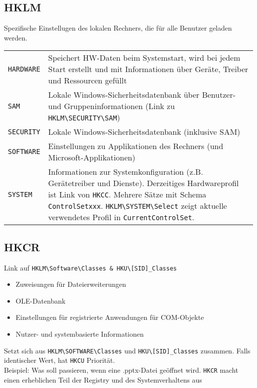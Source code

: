 \begin{multicols}{3}
\subsection{HKLM}
Spezifische Einstellugen des lokalen Rechners, die für alle Benutzer geladen werden.
\settowidth{\MyLen}{HLKM.folder.}
\begin{tabular}{@{}p{\the\MyLen}%
		@{}p{\linewidth-\the\MyLen}@{}}
	\texttt{HARDWARE} & Speichert HW-Daten beim Systemstart, wird bei jedem Start erstellt und mit Informationen über Geräte, Treiber und Ressourcen gefüllt\\
	\texttt{SAM} & Lokale Windows-Sicherheitsdatenbank über Benutzer- und Gruppeninformationen (Link zu \texttt{HKLM\textbackslash SECURITY\textbackslash SAM})\\
	\texttt{SECURITY} & Lokale Windows-Sicherheitsdatenbank (inklusive SAM)\\
	\texttt{SOFTWARE} & Einstellungen zu Applikationen des Rechners (und Microsoft-Applikationen)\\
	\texttt{SYSTEM} & Informationen zur Systemkonfiguration (z.B. Gerätetreiber und Dienste). Derzeitiges Hardwareprofil ist Link von \texttt{HKCC}. Mehrere Sätze mit Schema \texttt{ControlSetxxx}. \texttt{HKLM\textbackslash SYSTEM\textbackslash Select} zeigt aktuelle verwendetes Profil in \texttt{CurrentControlSet}.
\end{tabular}

\subsection{HKCR}
Link auf \texttt{HKLM\textbackslash Software\textbackslash Classes \& HKU\textbackslash [SID]\_Classes}
\begin{itemize}[leftmargin=*]
	\item Zuweisungen für Dateierweiterungen
	\item OLE-Datenbank
	\item Einstellungen für registrierte Anwendungen für COM-Objekte
	\item Nutzer- und systembasierte Informationen
\end{itemize}
Setzt sich aus \texttt{HKLM\textbackslash SOFTWARE\textbackslash Classes} und \texttt{HKU\textbackslash [SID]\_Classes} zusammen. Falls identischer Wert, hat \texttt{HKCU} Priorität.\\
Beispiel: Was soll passieren, wenn eine .pptx-Datei geöffnet wird. \texttt{HKCR} macht einen erheblichen Teil der Registry und des Systemverhaltens aus


\end{multicols}
